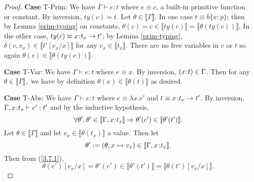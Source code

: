 \documentclass[11pt]{article}
\newcommand{\bind}{\hspace{0.05em}{:}\hspace{0.05em}} %
\newcommand{\col}{\mathbin{:}}       %
\newcommand{\lb}{\llbracket}         %
\newcommand{\rb}{\rrbracket}         %
\newcommand{\functype}[3]{#1\bind #2 \rightarrow #3}
\begin{document}
\begin{proof}



{\bf Case} {\sc T-Prim}: We have $\Gamma \vdash e : t$ where $e \equiv c$, a built-in primitive function or constant. By inversion, $ty(c) = t$. Let $\theta \in \lb \Gamma \rb$.
In one case $t \equiv b\{x\col p\}$; then by Lemma \ref{prim-typing} on constants, $\theta(c) = c \in \lb ty(c)\rb = \lb \theta(ty(c))\rb$. In the other case, $ty(c) \equiv \functype{x}{t_x}{t'}$; by Lemma \ref{prim-typing},
$\delta(c,v_x) \in \lb t'[v_x/x]\rb$ for any $v_x \in \lb t_x\rb.$ There are no free variables in $c$ or $t$ so again $\theta(c) \in \lb\theta(ty(c))\rb$.

{\bf Case} {\sc T-Var}: We have $\Gamma \vdash e : t$ where $e \equiv x$. By inversion, $(x\bind t) \in \Gamma$. Then for any $\theta \in \lb\Gamma\rb,$ we have by definition $\theta(x) \in \lb \theta(t)\rb$ as desired.

{\bf Case} {\sc T-Abs}: We have $\Gamma \vdash e : t$ where $e \equiv \lambda x.e'$ and $t \equiv \functype{x}{t_x}{t'}$. By inversion, $\Gamma,x\bind t_x \vdash e' : t'$ and by the inductive hypothesis,
\begin{equation}\label{3.7.1}
\forall\theta'.\, \theta' \in \lb\Gamma,x\bind t_x\rb \Rightarrow \theta'(e') \in \lb\theta'(t')\rb.\end{equation}
Let $\theta \in \lb\Gamma\rb$ and let $v_x \in \lb \theta(t_x)\rb$ a value. Then let
\[\theta' := (\theta,x\mapsto v_x) \in \lb\Gamma,x\bind t_x\rb.
\] 
Then from (\ref{3.7.1}), 
\begin{equation}\label{3.7.2}
\theta(e')[v_x/x] = \theta'(e') \in \lb\theta'(t')\rb = \lb\theta(t')[v_x/x]\rb.
\end{equation}


\end{proof}
\end{document}
